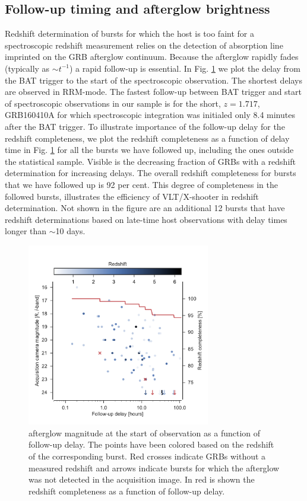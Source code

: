 \documentclass{aa}    %
\begin{document}
\subsection{Follow-up timing and afterglow brightness} \label{timing}

Redshift determination of bursts for which the host is too faint for a
spectroscopic redshift measurement relies on the detection of absorption line
imprinted on the GRB afterglow continuum. Because the afterglow rapidly fades
(typically as $\sim t^{-1}$) a rapid follow-up is essential. In Fig.
\ref{fig:timing} we plot the delay from the BAT trigger to the start of the
spectroscopic observation. The shortest delays are observed in RRM-mode. The
fastest follow-up between BAT trigger and start of spectroscopic observations in
our sample is for the short, $z = 1.717$, GRB160410A for which spectroscopic
integration was initialed only 8.4 minutes after the BAT trigger. To illustrate
importance of the follow-up delay for the redshift completeness, we plot the
redshift completeness as a function of delay time in Fig. \ref{fig:timing} for
all the bursts we have followed up, including the ones outside the statistical
sample. Visible is the decreasing fraction of GRBs with a redshift determination
for increasing delays. The overall redshift completeness for bursts that we have
followed up is 92 per cent. This degree of completeness in the followed bursts,
illustrates the efficiency of VLT/X-shooter in redshift determination. Not shown
in the figure are an additional 12 bursts that have redshift determinations
based on late-time host observations with delay times longer than $\sim$10 days.

\begin{figure}
	\centerline{\includegraphics[width=8cm]{figures/timing.pdf}} \caption{afterglow
	magnitude at the start of observation as a function of follow-up delay. The
	points have been colored based on the redshift of the corresponding burst. Red
	crosses indicate GRBs without a measured redshift and arrows indicate bursts
	for which the afterglow was not detected in the acquisition image. In red is
	shown the redshift completeness as a function of follow-up delay.}
\label{fig:timing}
\end{figure}
\end{document}

